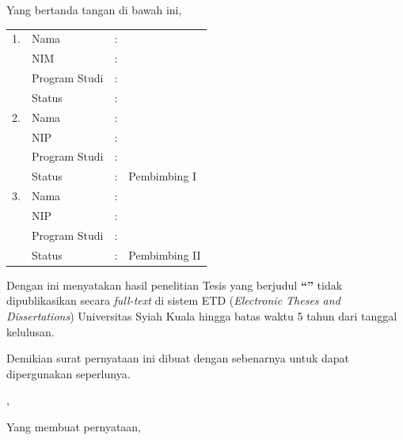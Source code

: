 %
\spernyataan %

\noindent
Yang bertanda tangan di bawah ini,
\vspace{-0.1cm}

\begin{table}[H]
\renewcommand{\arraystretch}{0.75}
\begin{tabularx}{\textwidth}{@{}l p{2.9cm} c >{\raggedright\arraybackslash}X@{}}
	1.	& Nama   	& : & \fullname \\
		& NIM   	& : & \idnum \\
		& Program Studi	& : & \programstudi \\
		& Status 	& : & \statusmahasiswa \\[4pt]
	2.	& Nama   	& : & \firstsupervisor \\
		& NIP    	& : & \firstnip \\
		& Program Studi	& : & \programstudi \\
		& Status 	& : & Pembimbing I \\[4pt]
	3.	& Nama   	& : & \secondsupervisor \\
		& NIP    	& : & \secondnip \\
		& Program Studi	& : & \programstudi \\
		& Status 	& : & Pembimbing II
\end{tabularx}
\end{table}

\vspace{-0.2cm}
\noindent
Dengan ini menyatakan hasil penelitian Tesis yang berjudul
\textbf{``\MakeUppercase{\judul}''} tidak dipublikasikan secara
\textit{full-text} di sistem ETD (\textit{Electronic Theses and
Dissertations}) Universitas Syiah Kuala hingga batas waktu 5 tahun dari
tanggal kelulusan.

\vspace{0.3cm}
\noindent
Demikian surat pernyataan ini dibuat dengan sebenarnya untuk dapat
dipergunakan seperlunya.

\vspace{0.3cm}

{\centering
\city, \disahkantanggal\par
\vspace{0.15cm}
Yang membuat pernyataan,\par
}

